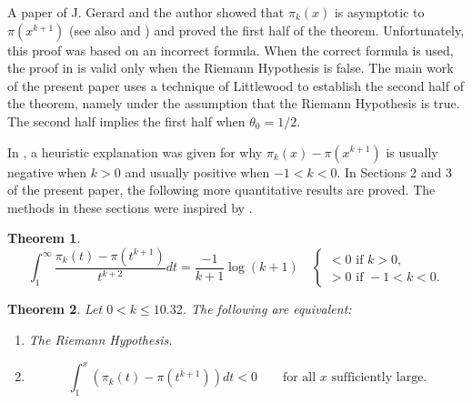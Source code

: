\documentclass[12pt]{amsart}
\newtheorem{theorem}{Theorem}
\begin{document}
A paper of J.  Gerard and the author \cite{GW} showed that $\pi_k(x)$ is asymptotic to $\pi(x^{k+1})$
(see also \cite{Ja} and \cite{SZ}) 
and proved the first half of the theorem. Unfortunately, this proof was based on an incorrect formula.
When the correct formula is used, the proof in \cite{GW} is valid only when the Riemann Hypothesis is false. The main work of the present paper uses a technique of Littlewood to establish the second half of the theorem, namely under the assumption that the Riemann Hypothesis is true.
The second half implies the first half when $\theta_0=1/2$. 

In \cite{GW}, a heuristic explanation was given for why $\pi_k(x) - \pi(x^{k+1})$ is usually negative when $k>0$ and usually positive when $-1<k<0$.
In Sections 2 and 3 of the present paper, the following more quantitative results are proved. The methods in these sections
were inspired by \cite{Jo}.
\begin{theorem}
$$
\int_1^{\infty} \frac{\pi_k(t) - \pi(t^{k+1})}{t^{k+2}} dt = \frac{-1}{k+1}\log(k+1) \quad \begin{cases} <0 \text{ if } k>0, \\  >0 \text{ if } -1 < k < 0.\end{cases}
$$
\end{theorem}
 
 \begin{theorem}
Let $0<k\le 10.32$. The following are equivalent:
\begin{enumerate}
\item The Riemann Hypothesis.
\item
$$
\int_1^x \left(\pi_k(t) - \pi(t^{k+1})\right) dt  < 0 \qquad \text{for all $x$ sufficiently large.}
$$

\end{enumerate}
\end{theorem}
\end{document}

